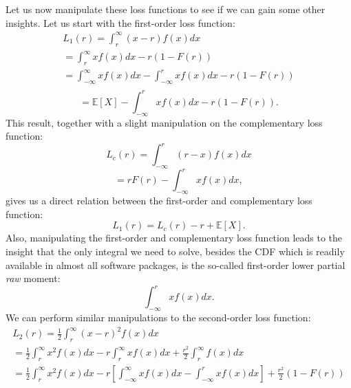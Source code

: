\documentclass{article}
\begin{document}
\begin{flushleft}
    Let us now manipulate these loss functions to see if we can gain some other insights.
    Let us start with the first-order loss function:
    \begin{equation*}
        \begin{gathered}
            L_1(r) = \int_r^\infty (x-r)f(x)dx \\
            = \int_r^\infty xf(x)dx - r(1-F(r)) \\
            = \int_{-\infty}^{\infty} xf(x)dx - \int_{-\infty}^r xf(x)dx - r(1-F(r)) \\
        \end{gathered}
    \end{equation*}
    \begin{equation} \label{eq:14}
        = \mathbb{E}[X]- \int_{-\infty}^r xf(x)dx - r(1-F(r)).
    \end{equation}
    This result, together with a slight manipulation on the complementary loss function:
    \begin{equation*}
        L_c(r) = \int_{-\infty}^r (r-x)f(x)dx
    \end{equation*}
    \begin{equation}
        = rF(r) - \int_{-\infty}^r xf(x)dx,
    \end{equation}
    gives us a direct relation between the first-order and complementary loss function:
    \begin{equation} \label{eq:16}
        L_1(r) = L_c(r) - r + \mathbb{E}[X].
    \end{equation}
    Also, manipulating the first-order and complementary loss function leads to the insight that the only integral we need to solve, besides the CDF which is readily available in almost all software packages, is the so-called first-order lower partial \textit{raw} moment:
    \begin{equation} \label{eq:17}
        \int_{-\infty}^r xf(x)dx.
    \end{equation}
    We can perform similar manipulations to the second-order loss function:
    \begin{equation} \label{eq:18}
        \begin{gathered}
            L_2(r) = \frac{1}{2}\int_r^\infty (x-r)^2f(x)dx \\
            = \frac{1}{2}\int_r^\infty x^2f(x)dx - r\int_r^\infty xf(x)dx + \frac{r^2}{2}\int_r^\infty f(x)dx \\
            = \frac{1}{2}\int_r^\infty x^2f(x)dx - r\left[\int_{-\infty}^\infty xf(x)dx - \int_{-\infty}^r xf(x)dx\right] + \frac{r^2}{2}(1-F(r)) \\

\end{gathered}
\end{equation}
\end{flushleft}
\end{document}
